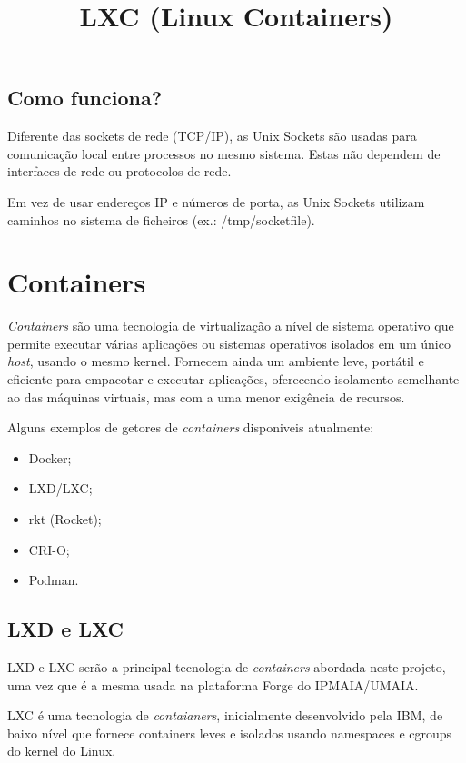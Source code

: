 \subsection{Como funciona?}

Diferente das sockets de rede (TCP/IP), as Unix Sockets são usadas para 
comunicação local entre processos no mesmo sistema. Estas não dependem de interfaces 
de rede ou protocolos de rede.

Em vez de usar endereços IP e números de porta, as Unix Sockets utilizam caminhos 
no sistema de ficheiros (ex.: /tmp/socketfile).

\section{Containers}

\textit{Containers} são uma tecnologia de virtualização a nível de sistema operativo que 
permite executar várias aplicações ou sistemas operativos isolados em um único \textit{host}, usando o mesmo kernel. 
Fornecem ainda um ambiente leve, portátil e eficiente para empacotar e executar aplicações,
oferecendo isolamento semelhante ao das máquinas virtuais, mas com a uma menor
exigência de recursos.

Alguns exemplos de getores de \textit{containers} disponiveis atualmente:
\begin{itemize}
    \item Docker;
    \item LXD/LXC;
    \item rkt (Rocket);
    \item CRI-O;
    \item Podman.
\end{itemize}



\subsection{LXD e LXC}

LXD e LXC serão a principal tecnologia de \textit{containers} abordada neste projeto,
uma vez que é a mesma usada na plataforma Forge do IPMAIA/UMAIA. \\



\title*{\textbf{LXC (Linux Containers)}}

LXC é uma tecnologia de \textit{contaianers}, inicialmente desenvolvido pela IBM, 
de baixo nível que fornece containers leves e isolados usando namespaces e cgroups 
do kernel do Linux. \\

